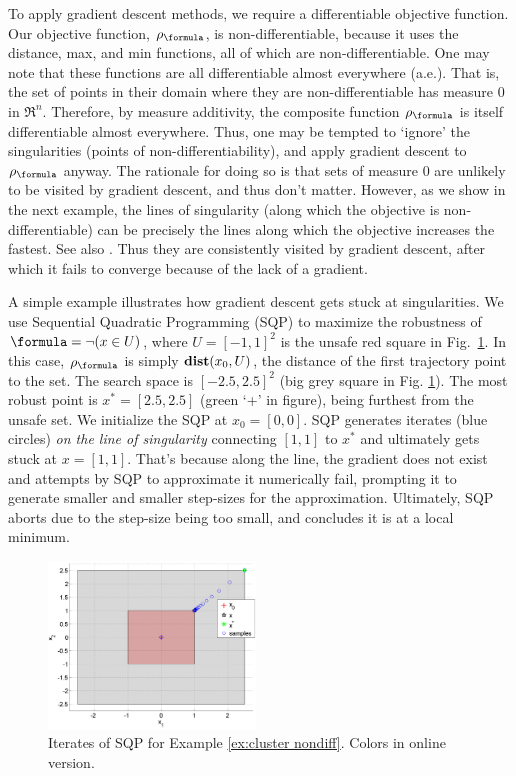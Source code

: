 To apply gradient descent methods, we require a differentiable objective function. 
Our objective function, $\robf$, is non-differentiable, because it uses the distance, max, and min functions, all of which are non-differentiable.
One may note that these functions are all differentiable almost everywhere (a.e.).
That is, the set of points in their domain where they are non-differentiable has measure 0 in $\Re^n$. 
Therefore, by measure additivity, the composite function $\robf$ is itself differentiable almost everywhere.
Thus, one may be tempted to `ignore' the singularities (points of non-differentiability), and apply gradient descent to $\robf$ anyway.
The rationale for doing so is that sets of measure 0 are unlikely to be visited by gradient descent, and thus don't matter. 
However, as we show in the next example, the lines of singularity (along which the objective is non-differentiable) can be  precisely the lines along which the objective increases the fastest.
See also \cite{Cortes08_Discontinuous}.
Thus they are consistently visited by gradient descent, after which it fails to converge because of the lack of a gradient.


\begin{exmp}
	\label{ex:cluster nondiff}
	A simple example illustrates how gradient descent gets stuck at singularities.
	We use Sequential Quadratic Programming (SQP) \cite{Polak97_Optim} to maximize the robustness of $\formula = \neg (x \in U)$, where $U=[-1,1]^2$ is the unsafe red square in Fig.~\ref{fig:DumbExample}.
	In this case, $\robf$ is simply $\mathbf{dist}(x_0,U)$, the distance of the first trajectory point to the set.
	The search space is $[-2.5,2.5]^2$ (big grey square in Fig. \ref{fig:DumbExample}). 
	The most robust point is $x^* = [2.5,2.5]$ (green `+' in figure), being furthest from the unsafe set.
	We initialize the SQP at $x_0=[0,0]$. 
	SQP generates iterates (blue circles) \textit{on the line of singularity} connecting $[1,1]$ to $x^*$ and ultimately gets stuck at $x=[1,1]$.
	That's because along the line, the gradient does not exist and attempts by SQP to approximate it numerically fail, prompting it to generate smaller and smaller step-sizes for the approximation.
	Ultimately, SQP aborts due to the step-size being too small, and concludes it is at a local minimum.
\end{exmp}	
\begin{figure}[t]
\centering
\includegraphics[width=0.49\textwidth]{figures/DumbOptEx_scissored}
\vspace{-20pt}
\caption{{\small Iterates of SQP for Example \ref{ex:cluster nondiff}. Colors in online version.}}
\vspace{-10pt}
\label{fig:DumbExample}
\end{figure}


